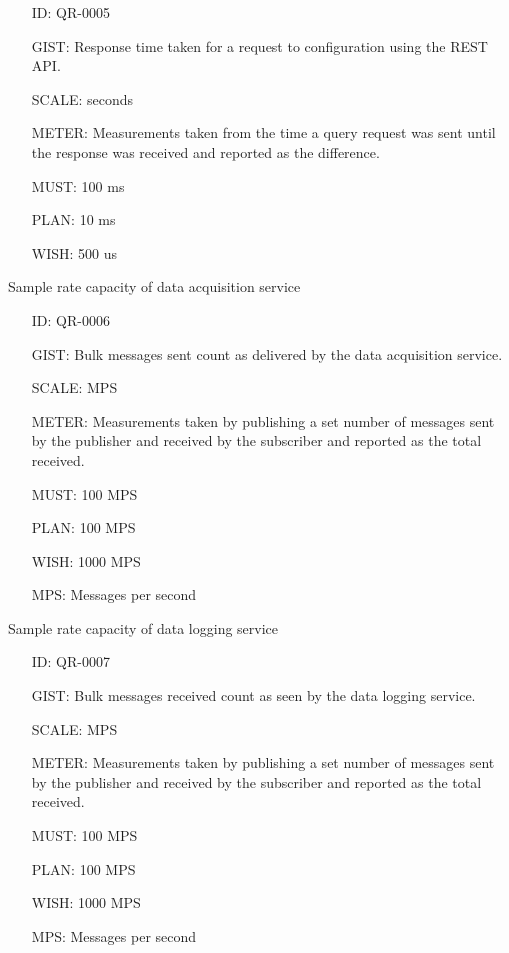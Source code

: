         \begin{itemize}
          \setlength{\itemindent}{.5in}
          \itemsep .15em
          \item[ID:] QR-0005
          \item[GIST:] Response time taken for a request to configuration
            using the REST API.
          \item[SCALE:] seconds
          \item[METER:] Measurements taken from the time a query request was
            sent until the response was received and reported as the difference.
          \item[MUST:] 100 ms
          \item[PLAN:] 10 ms
          \item[WISH:] 500 us
        \end{itemize}

        Sample rate capacity of data acquisition service

        \begin{itemize}
          \setlength{\itemindent}{.5in}
          \itemsep .15em
          \item[ID:] QR-0006
          \item[GIST:] Bulk messages sent count as delivered by the data
            acquisition service.
          \item[SCALE:] MPS
          \item[METER:] Measurements taken by publishing a set number of
            messages sent by the publisher and received by the subscriber and
            reported as the total received.
          \item[MUST:] 100 MPS
          \item[PLAN:] 100 MPS
          \item[WISH:] 1000 MPS
          \item[MPS:] Messages per second
        \end{itemize}

        Sample rate capacity of data logging service

        \begin{itemize}
          \setlength{\itemindent}{.5in}
          \itemsep .15em
          \item[ID:] QR-0007
          \item[GIST:] Bulk messages received count as seen by the data logging
            service.
          \item[SCALE:] MPS
          \item[METER:] Measurements taken by publishing a set number of
            messages sent by the publisher and received by the subscriber and
            reported as the total received.
          \item[MUST:] 100 MPS
          \item[PLAN:] 100 MPS
          \item[WISH:] 1000 MPS
          \item[MPS:] Messages per second
        \end{itemize}

